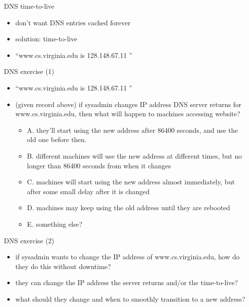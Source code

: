 
\begin{frame}{DNS time-to-live}
    \begin{itemize}
    \item don't want DNS entries cached forever
    \item solution: time-to-live
    \item ``www.cs.virginia.edu is 128.148.67.11 ''
    \end{itemize}
\end{frame}

\begin{frame}{DNS exercise (1)}
    \begin{itemize}
    \item ``www.cs.virginia.edu is 128.148.67.11 ''
    \item (given record above)
    if sysadmin changes IP address DNS server returns for www.cs.virginia.edu,
    then what will happen to machines accessing website?
        \begin{itemize}
        \item A. they'll start using the new address after 86400 seconds, and use the old one before then.
        \item B. different machines will use the new address at different times, but no longer than 86400 seconds from when it changes
        \item C. machines will start using the new address almost immediately, but after some small delay after it is changed
        \item D. machines may keep using the old address until they are rebooted
        \item E. something else?
        \end{itemize}
    \end{itemize}
\end{frame}

\begin{frame}{DNS exercise (2)}
    \begin{itemize}
    \item if sysadmin wants to change the IP address of www.cs.virginia.edu,
            how do they do this without downtime?
    \vspace{.5cm}
    \item they can change the IP address the server returns and/or the time-to-live?
    \item what should they change and when to smoothly transition to a new address?
    \end{itemize}
\end{frame}
